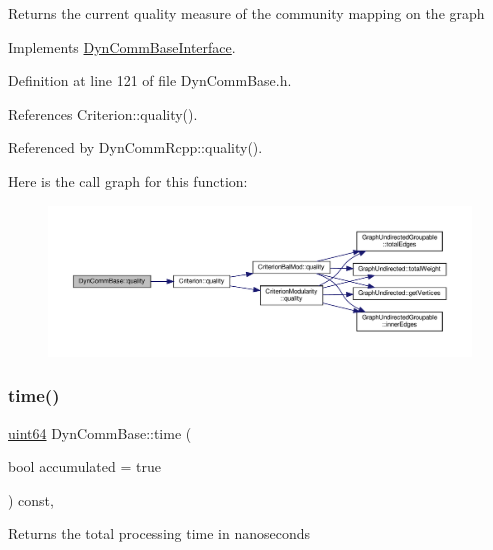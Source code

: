 \begin{DoxyReturn}{Returns}
the current quality measure of the community mapping on the graph 
\end{DoxyReturn}


Implements \hyperlink{classDynCommBaseInterface_a42863260fe57e0982be227255d4f8464}{Dyn\+Comm\+Base\+Interface}.



Definition at line 121 of file Dyn\+Comm\+Base.\+h.



References Criterion\+::quality().



Referenced by Dyn\+Comm\+Rcpp\+::quality().

Here is the call graph for this function\+:
\nopagebreak
\begin{figure}[H]
\begin{center}
\leavevmode
\includegraphics[width=350pt]{classDynCommBase_a316b2c63a025810211d205ef6bf1d06c_cgraph}
\end{center}
\end{figure}
\mbox{\label{classDynCommBase_a5b40eb14cef877fde1db8b6476f6a2ce}} 
\subsubsection{\texorpdfstring{time()}{time()}}
{\footnotesize\ttfamily \hyperlink{systemDefines_8h_abc0f5bc07737e498f287334775dff2b6}{uint64} Dyn\+Comm\+Base\+::time (\begin{DoxyParamCaption}\item[{bool}]{accumulated = {\ttfamily true} }\end{DoxyParamCaption}) const\hspace{0.3cm}{\ttfamily [inline]}, {\ttfamily [virtual]}}

\begin{DoxyReturn}{Returns}
the total processing time in nanoseconds 
\end{DoxyReturn}


